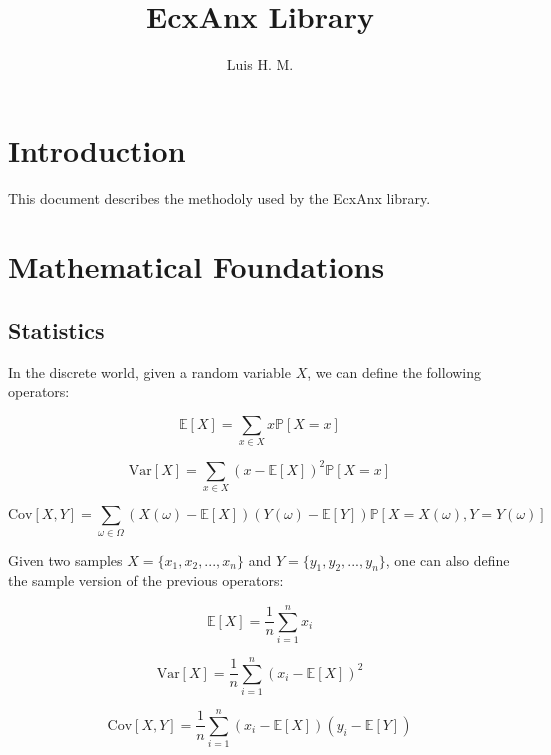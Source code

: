 \documentclass[•]{article}
\title{EcxAnx Library}
\author{Luis H. M.}
\date{}
\begin{document}
\maketitle


\section{Introduction}

This document describes the methodoly used by the EcxAnx library.

\section {Mathematical Foundations}

\subsection{Statistics}

In the discrete world, given a random variable $X$, we can define the following operators:

\begin{equation}
\mathbb{E}[X] = \sum_{x \in X} x \mathbb{P}[X = x]
\end{equation}

\begin{equation}
\text{Var}[X] = \sum_{x \in X} (x-\mathbb{E}[X])^2 \mathbb{P}[X = x]
\end{equation}

\begin{equation}
\text{Cov}[X,Y] = \sum_{\omega \in \Omega} (X(\omega) - \mathbb{E}[X])(Y(\omega) - \mathbb{E}[Y])\mathbb{P}[X=X(\omega), Y=Y(\omega)]
\end{equation}

Given two samples $X = \{ x_1, x_2, ..., x_n\}$ and $Y = \{y_1, y_2, ..., y_n \}$, one can also define the sample version of the previous operators:

\begin{equation}
\mathbb{E}[X] = \frac{1}{n} \sum_{i=1}^n x_i
\end{equation}

\begin{equation}
\text{Var}[X] = \frac{1}{n}\sum_{i=1}^n (x_i-\mathbb{E}[X])^2
\end{equation}

\begin{equation}
\text{Cov}[X,Y] = \frac{1}{n}\sum_{i=1}^n (x_i - \mathbb{E}[X])(y_i - \mathbb{E}[Y])
\end{equation}
\end{document}
